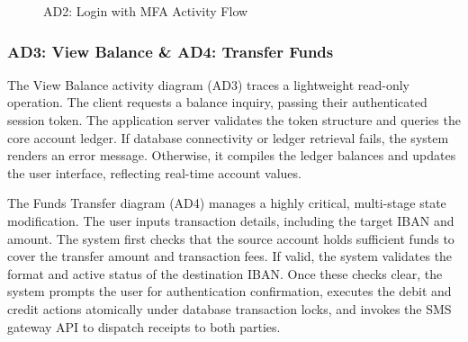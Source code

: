 \documentclass[11pt,a4paper]{article}
\begin{document}
\begin{figure}[H]
\begin{minipage}{0.48\textwidth}
  \caption{AD2: Login with MFA Activity Flow}
\end{minipage}
\end{figure}

\newpage

\subsubsection{AD3: View Balance \& AD4: Transfer Funds}
The View Balance activity diagram (AD3) traces a lightweight read-only operation. The client requests a balance inquiry, passing their authenticated session token. The application server validates the token structure and queries the core account ledger. If database connectivity or ledger retrieval fails, the system renders an error message. Otherwise, it compiles the ledger balances and updates the user interface, reflecting real-time account values.

The Funds Transfer diagram (AD4) manages a highly critical, multi-stage state modification. The user inputs transaction details, including the target IBAN and amount. The system first checks that the source account holds sufficient funds to cover the transfer amount and transaction fees. If valid, the system validates the format and active status of the destination IBAN. Once these checks clear, the system prompts the user for authentication confirmation, executes the debit and credit actions atomically under database transaction locks, and invokes the SMS gateway API to dispatch receipts to both parties.
\end{document}
